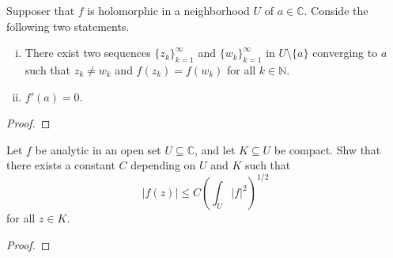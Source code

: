 \documentclass{article}
\newenvironment{problem}[2][Problem]{\begin{trivlist}
\item[\hskip \labelsep {\bfseries #1}\hskip \labelsep {\bfseries #2.}]}{\end{trivlist}}
\begin{document}
\pagebreak

\begin{problem}{3}
  Supposer that $f$ is holomorphic in a neighborhood $U$ of $a \in \mathbb C$.
  Conside the following two statements.
  \begin{enumerate}[(i)]
    \item There exist two sequences $\{z_k\}_{k=1}^\infty$ and
    $\{w_k\}_{k=1}^\infty$ in $U \setminus \{a\}$ converging to $a$ such that
    $z_k \neq w_k$ and $f(z_k) = f(w_k)$ for all $k \in \mathbb N$.
    \item $f'(a) = 0$.
  \end{enumerate}
\end{problem}

\begin{proof}
\end{proof}

\pagebreak

\begin{problem}{4}
  Let $f$ be analytic in an open set $U \subseteq \mathbb C$, and let
  $K \subseteq U$ be compact. Shw that there exists a constant $C$ depending on
  $U$ and $K$ such that \[
    |f(z)| \leq C\left(\int_U|f|^2\right)^{1/2}
  \] for all $z \in K$.
\end{problem}

\begin{proof}
\end{proof}
\end{document}
